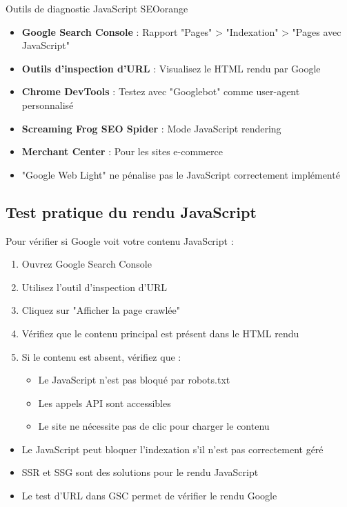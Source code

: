 \documentclass[12pt,a4paper,twoside]{report}
\begin{document}
\begin{mybox}{Outils de diagnostic JavaScript SEO}{orange}
\begin{itemize}
    \item \textbf{Google Search Console} : Rapport "Pages" > "Indexation" > "Pages avec JavaScript"
    \item \textbf{Outils d'inspection d'URL} : Visualisez le HTML rendu par Google
    \item \textbf{Chrome DevTools} : Testez avec "Googlebot" comme user-agent personnalisé
    \item \textbf{Screaming Frog SEO Spider} : Mode JavaScript rendering
    \item \textbf{Merchant Center} : Pour les sites e-commerce
    \item "Google Web Light" ne pénalise pas le JavaScript correctement implémenté
\end{itemize}
\end{mybox}

\subsection{Test pratique du rendu JavaScript}

Pour vérifier si Google voit votre contenu JavaScript :

\begin{enumerate}
    \item Ouvrez Google Search Console
    \item Utilisez l'outil d'inspection d'URL
    \item Cliquez sur "Afficher la page crawlée"
    \item Vérifiez que le contenu principal est présent dans le HTML rendu
    \item Si le contenu est absent, vérifiez que :
    \begin{itemize}
        \item Le JavaScript n'est pas bloqué par robots.txt
        \item Les appels API sont accessibles
        \item Le site ne nécessite pas de clic pour charger le contenu
    \end{itemize}
\end{enumerate}

\begin{takeaways}
\begin{itemize}
    \item Le JavaScript peut bloquer l'indexation s'il n'est pas correctement géré
    \item SSR et SSG sont des solutions pour le rendu JavaScript
    \item Le test d'URL dans GSC permet de vérifier le rendu Google
\end{itemize}
\end{takeaways}
\end{document}
